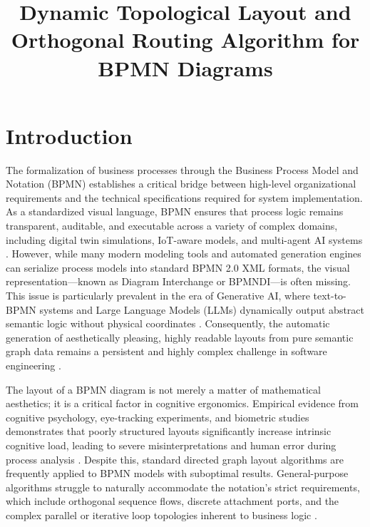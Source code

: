 \documentclass{article}
\title{Dynamic Topological Layout and Orthogonal Routing Algorithm for BPMN Diagrams}
\author{}
\date{}
\begin{document}
	\maketitle
	
	\section{Introduction}
	The formalization of business processes through the Business Process Model and Notation (BPMN) establishes a critical bridge between high-level organizational requirements and the technical specifications required for system implementation. As a standardized visual language, BPMN ensures that process logic remains transparent, auditable, and executable across a variety of complex domains, including digital twin simulations, IoT-aware models, and multi-agent AI systems \cite{ref_akinbowale, ref_tebourbi, ref_lopes}. However, while many modern modeling tools and automated generation engines can serialize process models into standard BPMN 2.0 XML formats, the visual representation---known as Diagram Interchange or BPMNDI---is often missing. This issue is particularly prevalent in the era of Generative AI, where text-to-BPMN systems and Large Language Models (LLMs) dynamically output abstract semantic logic without physical coordinates \cite{ref_licardo, ref_kourani_promoai, ref_nivon}. Consequently, the automatic generation of aesthetically pleasing, highly readable layouts from pure semantic graph data remains a persistent and highly complex challenge in software engineering \cite{ref_jointjs, ref_effinger_interactive}.
	
	The layout of a BPMN diagram is not merely a matter of mathematical aesthetics; it is a critical factor in cognitive ergonomics. Empirical evidence from cognitive psychology, eye-tracking experiments, and biometric studies demonstrates that poorly structured layouts significantly increase intrinsic cognitive load, leading to severe misinterpretations and human error during process analysis \cite{ref_de_souza, ref_lubke_eye, ref_schrepfer, ref_wlekly}. Despite this, standard directed graph layout algorithms are frequently applied to BPMN models with suboptimal results. General-purpose algorithms struggle to naturally accommodate the notation's strict requirements, which include orthogonal sequence flows, discrete attachment ports, and the complex parallel or iterative loop topologies inherent to business logic \cite{ref_kitzmann, ref_gschwind}. 
	
\end{document}
